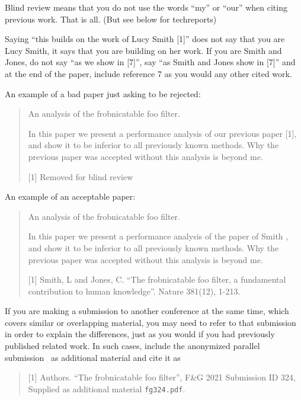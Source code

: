 \documentclass[10pt,twocolumn,letterpaper]{article}
\begin{document}
Blind review means that you do not use the words ``my'' or ``our''
when citing previous work.  That is all.  (But see below for
techreports)

Saying ``this builds on the work of Lucy Smith [1]'' does not say
that you are Lucy Smith, it says that you are building on her
work.  If you are Smith and Jones, do not say ``as we show in
[7]'', say ``as Smith and Jones show in [7]'' and at the end of the
paper, include reference 7 as you would any other cited work.

An example of a bad paper just asking to be rejected:
\begin{quote}
\begin{center}
    An analysis of the frobnicatable foo filter.
\end{center}

   In this paper we present a performance analysis of our
   previous paper [1], and show it to be inferior to all
   previously known methods.  Why the previous paper was
   accepted without this analysis is beyond me.

   [1] Removed for blind review
\end{quote}


An example of an acceptable paper:

\begin{quote}
\begin{center}
     An analysis of the frobnicatable foo filter.
\end{center}

   In this paper we present a performance analysis of the
   paper of Smith \etal [1], and show it to be inferior to
   all previously known methods.  Why the previous paper
   was accepted without this analysis is beyond me.

   [1] Smith, L and Jones, C. ``The frobnicatable foo
   filter, a fundamental contribution to human knowledge''.
   Nature 381(12), 1-213.
\end{quote}

If you are making a submission to another conference at the same time,
which covers similar or overlapping material, you may need to refer to that
submission in order to explain the differences, just as you would if you
had previously published related work.  In such cases, include the
anonymized parallel submission~\cite{Authors12final} as additional material and
cite it as
\begin{quote}
[1] Authors. ``The frobnicatable foo filter'', F\&G 2021 Submission ID 324,
Supplied as additional material {\tt fg324.pdf}.
\end{quote}
\end{document}

